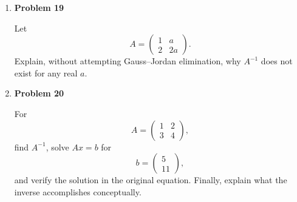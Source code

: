 \begin{enumerate}
\item \textbf{Problem 19}\par
Let
\[
A=\begin{pmatrix}
1&a\\
2&2a
\end{pmatrix}.
\]
Explain, without attempting Gauss--Jordan elimination, why \(A^{-1}\) does not exist for any real \(a\).

\item \textbf{Problem 20}\par
For
\[
A=\begin{pmatrix}
1&2\\
3&4
\end{pmatrix},
\]
find \(A^{-1}\), solve \(Ax=b\) for
\[
b=\begin{pmatrix}5\\11\end{pmatrix},
\]
and verify the solution in the original equation. Finally, explain what the inverse accomplishes conceptually.
\end{enumerate}
